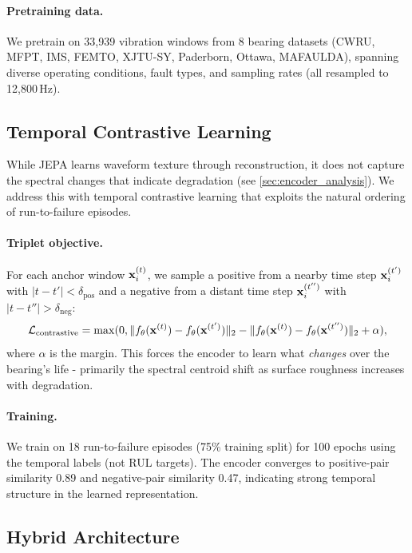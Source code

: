 \paragraph{Pretraining data.} We pretrain on 33{,}939 vibration windows from 8 bearing datasets (CWRU, MFPT, IMS, FEMTO, XJTU-SY, Paderborn, Ottawa, MAFAULDA), spanning diverse operating conditions, fault types, and sampling rates (all resampled to 12{,}800\,Hz).

\subsection{Temporal Contrastive Learning}
\label{sec:contrastive}

While JEPA learns waveform texture through reconstruction, it does not capture the spectral changes that indicate degradation (see \cref{sec:encoder_analysis}). We address this with temporal contrastive learning that exploits the natural ordering of run-to-failure episodes.

\paragraph{Triplet objective.} For each anchor window $\mathbf{x}_i^{(t)}$, we sample a positive from a nearby time step $\mathbf{x}_i^{(t')}$ with $|t - t'| < \delta_{\text{pos}}$ and a negative from a distant time step $\mathbf{x}_i^{(t'')}$ with $|t - t''| > \delta_{\text{neg}}$:
\begin{equation}
  \mathcal{L}_{\text{contrastive}} = \max(0, \| f_\theta(\mathbf{x}^{(t)}) - f_\theta(\mathbf{x}^{(t')}) \|_2 - \| f_\theta(\mathbf{x}^{(t)}) - f_\theta(\mathbf{x}^{(t'')}) \|_2 + \alpha),
  \label{eq:contrastive}
\end{equation}
where $\alpha$ is the margin. This forces the encoder to learn what \emph{changes} over the bearing's life - primarily the spectral centroid shift as surface roughness increases with degradation.

\paragraph{Training.} We train on 18 run-to-failure episodes (75\% training split) for 100 epochs using the temporal labels (not RUL targets). The encoder converges to positive-pair similarity 0.89 and negative-pair similarity 0.47, indicating strong temporal structure in the learned representation.

\subsection{Hybrid Architecture}
\label{sec:hybrid}


